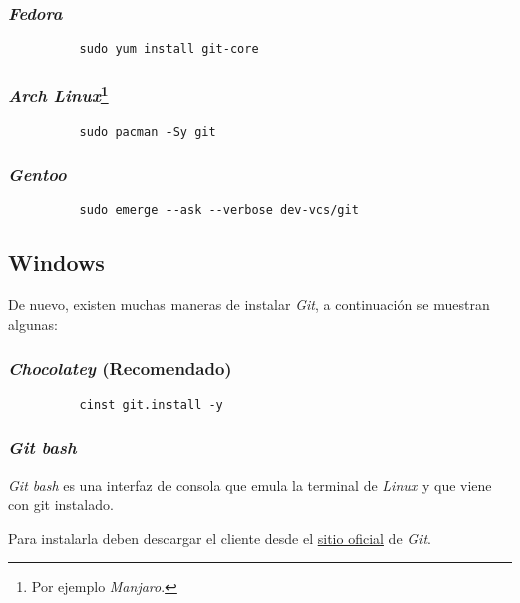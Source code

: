       \subsubsection{\textit{Fedora}}
        \begin{verbatim}
          sudo yum install git-core
        \end{verbatim}

      \subsubsection{\textit{Arch Linux}\footnote{Por ejemplo \textit{Manjaro}.}}
        \begin{verbatim}
          sudo pacman -Sy git
        \end{verbatim}

      \subsubsection{\textit{Gentoo}}
        \begin{verbatim}
          sudo emerge --ask --verbose dev-vcs/git
        \end{verbatim}

    \subsection{Windows}
      De nuevo, existen muchas maneras de instalar \textit{Git}, a continuación se 
      muestran algunas:

      \subsubsection{\textit{Chocolatey} (Recomendado)}
        \begin{verbatim}
          cinst git.install -y
        \end{verbatim}

      \subsubsection{\textit{Git bash}}
        \textit{Git bash} es una interfaz de consola que emula la terminal de 
        \textit{Linux} y que viene con git instalado.
        
        Para instalarla deben descargar el cliente desde el 
        \href{https://git-scm.com/download/win}{sitio oficial} de \textit{Git}.

